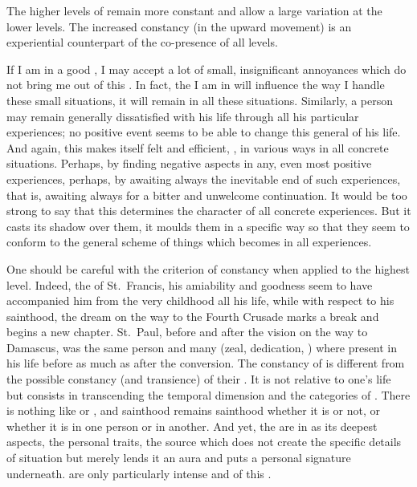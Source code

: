 \pa
The higher levels of 
 remain more constant and allow a large variation at 
the lower levels. The increased constancy (in the upward movement) is an
experiential counterpart of the co-presence of all levels. 

If I am in a good , I may accept a lot of small, insignificant
annoyances which do not bring me out of this . In fact, the  I
am in will influence the way I handle these small situations, it will
remain  in all these  situations.  Similarly, a person
may remain generally dissatisfied with his life through all his particular
experiences; no positive event seems to be able to change this general
 of his life.  And again, this  makes itself felt and
efficient, , in various ways in all concrete situations.  Perhaps,
by finding negative aspects in any, even most positive experiences, perhaps, by
awaiting always the inevitable end of such experiences, that is, awaiting always
for a bitter and unwelcome continuation.  It would be too strong to say that
this  determines the character of all concrete experiences.  But it
casts its shadow over them, it moulds them in a specific way so that they seem
to conform to the general scheme of things which becomes  in all
 experiences.

One should be careful with the criterion of constancy when applied to the
highest level.  Indeed, the  of St.~Francis, his amiability
and goodness seem to have accompanied him from the very childhood all his life,
while with respect to his sainthood, the dream on the way to the Fourth Crusade
marks a break and begins a new chapter. St.~Paul, before and after the vision on
the way to Damascus, was the same person and many  (zeal,
dedication, ) where present in his life before as much as
after the conversion.  The constancy of  is different from the
possible constancy (and transience) of their .  It is not
relative to one's life but consists in transcending the temporal dimension and
the categories of .  There is nothing like 
or , and sainthood remains sainthood whether it is
 or not, or whether it is  in one person or in
another.  And yet, the  are  in 
as its deepest aspects, the  personal traits, the source which
does not create the specific details of  situation but merely lends
it an aura and puts a personal signature underneath.  are
only particularly intense and  of this . 

